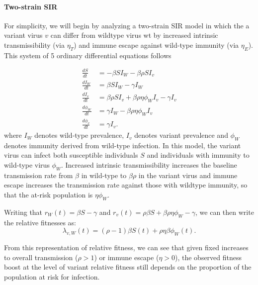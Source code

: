 \documentclass[11pt,oneside,letterpaper]{article}
\newcommand{\wt}{W}
\newcommand{\varEscape}{\eta}
\newcommand{\varTransmission}{\rho}
\begin{document}
\paragraph{Two-strain SIR}%

For simplicity, we will begin by analyzing a two-strain SIR model in which the a variant virus $v$ can differ from wildtype virus wt by increased intrinsic transmissibility (via $\varEscape_{T}$) and immune escape against wild-type immunity (via $\varEscape_{E}$).
This system of 5 ordinary differential equations follows

\begin{align*}
    \frac{d S}{d t} &= - \beta S I_{\wt} - \beta \varTransmission S I_{v}\\
    \frac{d I_{\wt}}{dt} &= \beta S I_{\wt} - \gamma I_{\wt}\\
    \frac{d I_{v}}{dt} &= \beta \varTransmission S I_{v} + \beta \varTransmission \varEscape \phi_{\wt} I_{v} - \gamma I_{v}\\
    \frac{d \phi_{\wt}}{dt} &= \gamma I_{\wt} - \beta \varTransmission \varEscape \phi_{\wt} I_{v}\\
    \frac{d \phi_{v}}{dt} &= \gamma I_{v}.
\end{align*}
where $I_{\wt}$ denotes wild-type prevalence, $I_{v}$ denotes variant prevalence and $\phi_{\wt}$ denotes immunity derived from wild-type infection.
In this model, the variant virus can infect both susceptible individuals $S$ and individuals with immunity to wild-type virus $\phi_{\wt}$.
Increased intrinsic transmissibility increases the baseline transmission rate from $\beta$ in wild-type to $\beta \varTransmission$ in the variant virus and immune escape increases the transmission rate against those with wildtype immunity, so that the at-risk population is $\varEscape \phi_{\wt}$.

Writing that $r_{\wt}(t) = \beta S - \gamma$ and $r_{v}(t) = \varTransmission \beta  S + \beta \varTransmission \varEscape \phi_{\wt} - \gamma$, we can then write the relative fitnesses as:
\begin{equation} \label{eq:two_strain_relative_fitness}
\lambda_{v,\wt}(t) = (\varTransmission - 1)\beta S(t) + \varTransmission \varEscape \beta \phi_{\wt}(t).
\end{equation}

From this representation of relative fitness, we can see that given fixed increases to overall transmission ($\varTransmission > 1$) or immune escape ($\varEscape > 0$), the observed fitness boost at the level of variant relative fitness still depends on the proportion of the population at risk for infection.
\end{document}
